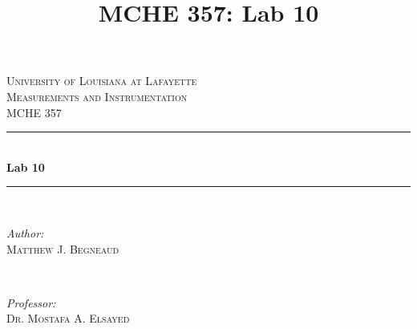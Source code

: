 \documentclass[12pt]{article}
\title{MCHE 357: Lab 10}
\begin{document}




\begin{titlepage}

\newcommand{\HRule}{\rule{\linewidth}{0.5mm}} %

\center %
 

\textsc{\LARGE University of Louisiana at Lafayette}\\[1.5cm] %
\textsc{\Large Measurements and Instrumentation}\\[0.5cm] %
\textsc{\large MCHE 357}\\[0.5cm] %


\HRule \\[0.4cm]
{ \huge \bfseries Lab 10}\\[0.4cm] %
\HRule \\[1.5cm]
 

\begin{minipage}{0.4\textwidth}
\begin{flushleft} \large
\emph{Author:}\\
\textsc{Matthew J. Begneaud} \\%
\end{flushleft}
\end{minipage}
~
\begin{minipage}{0.4\textwidth}
\begin{flushright} \large
\emph{Professor:} \\
\textsc{Dr. Mostafa A. Elsayed} %
\end{flushright}
\end{minipage}\\[1.5cm]


\end{titlepage}
\end{document}
